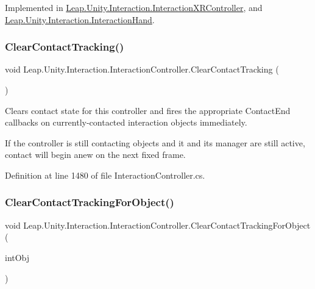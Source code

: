 Implemented in \mbox{\hyperlink{class_leap_1_1_unity_1_1_interaction_1_1_interaction_x_r_controller_a46275014cfc4325621c01097047bb701}{Leap.\+Unity.\+Interaction.\+Interaction\+X\+R\+Controller}}, and \mbox{\hyperlink{class_leap_1_1_unity_1_1_interaction_1_1_interaction_hand_aaf0c4bf5f6892517ac5be576104550b4}{Leap.\+Unity.\+Interaction.\+Interaction\+Hand}}.

\mbox{\label{class_leap_1_1_unity_1_1_interaction_1_1_interaction_controller_a9496bf1f9d82ea3a027b2bdf630df4e5}} 
\subsubsection{\texorpdfstring{ClearContactTracking()}{ClearContactTracking()}}
{\footnotesize\ttfamily void Leap.\+Unity.\+Interaction.\+Interaction\+Controller.\+Clear\+Contact\+Tracking (\begin{DoxyParamCaption}{ }\end{DoxyParamCaption})}



Clears contact state for this controller and fires the appropriate Contact\+End callbacks on currently-\/contacted interaction objects immediately. 

If the controller is still contacting objects and it and its manager are still active, contact will begin anew on the next fixed frame. 

Definition at line 1480 of file Interaction\+Controller.\+cs.

\mbox{\label{class_leap_1_1_unity_1_1_interaction_1_1_interaction_controller_a5dd3dbbc1e54365599aa7f8890be5ca0}} 
\subsubsection{\texorpdfstring{ClearContactTrackingForObject()}{ClearContactTrackingForObject()}}
{\footnotesize\ttfamily void Leap.\+Unity.\+Interaction.\+Interaction\+Controller.\+Clear\+Contact\+Tracking\+For\+Object (\begin{DoxyParamCaption}\item[{\mbox{\hyperlink{interface_leap_1_1_unity_1_1_interaction_1_1_i_interaction_behaviour}{I\+Interaction\+Behaviour}}}]{int\+Obj }\end{DoxyParamCaption})}



